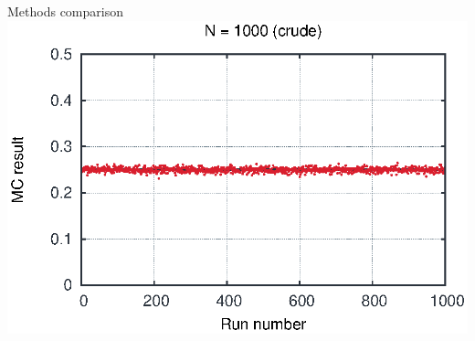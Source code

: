 \begin{emptyslide}{Methods comparison}
{    \includegraphics[width=\columnwidth]{figures/int21000.eps}
  }

\vfill\null
\end{emptyslide}
